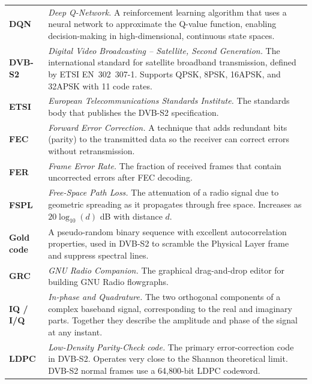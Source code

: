 \documentclass[12pt,a4paper]{report}
\begin{document}
\begin{longtable}{p{3.2cm}p{10.5cm}}
\textbf{DQN} & \textit{Deep Q-Network.}  A reinforcement learning algorithm
    that uses a neural network to approximate the Q-value function, enabling
    decision-making in high-dimensional, continuous state spaces. \\[4pt]

\textbf{DVB-S2} & \textit{Digital Video Broadcasting -- Satellite, Second
    Generation.}  The international standard for satellite broadband transmission,
    defined by ETSI EN~302~307-1.  Supports QPSK, 8PSK, 16APSK, and 32APSK
    with 11 code rates. \\[4pt]

\textbf{ETSI} & \textit{European Telecommunications Standards Institute.}  The
    standards body that publishes the DVB-S2 specification. \\[4pt]

\textbf{FEC} & \textit{Forward Error Correction.}  A technique that adds
    redundant bits (parity) to the transmitted data so the receiver can correct
    errors without retransmission. \\[4pt]

\textbf{FER} & \textit{Frame Error Rate.}  The fraction of received frames that
    contain uncorrected errors after FEC decoding. \\[4pt]

\textbf{FSPL} & \textit{Free-Space Path Loss.}  The attenuation of a radio
    signal due to geometric spreading as it propagates through free space.
    Increases as $20\log_{10}(d)$ dB with distance $d$. \\[4pt]

\textbf{Gold code} & A pseudo-random binary sequence with excellent
    autocorrelation properties, used in DVB-S2 to scramble the Physical Layer
    frame and suppress spectral lines. \\[4pt]

\textbf{GRC} & \textit{GNU Radio Companion.}  The graphical drag-and-drop
    editor for building GNU Radio flowgraphs. \\[4pt]

\textbf{IQ / I/Q} & \textit{In-phase and Quadrature.}  The two orthogonal
    components of a complex baseband signal, corresponding to the real and
    imaginary parts.  Together they describe the amplitude and phase of the
    signal at any instant. \\[4pt]

\textbf{LDPC} & \textit{Low-Density Parity-Check code.}  The primary
    error-correction code in DVB-S2.  Operates very close to the Shannon
    theoretical limit.  DVB-S2 normal frames use a 64,800-bit LDPC codeword. \\[4pt]


\end{longtable}
\end{document}
